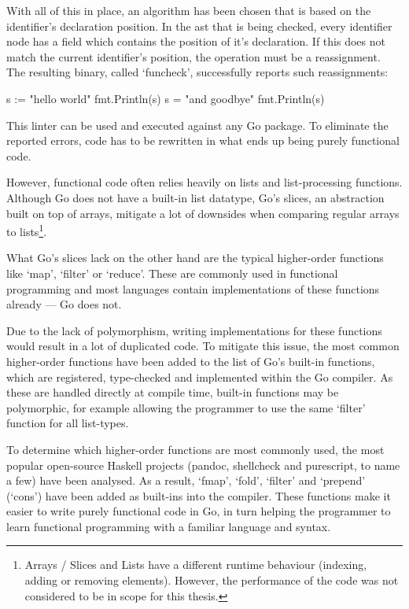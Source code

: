 With all of this in place, an algorithm has been chosen that is based on the identifier's
declaration position. In the \gls{ast} that is being checked, every identifier node has a field
which contains the position of it's declaration. If this does not match the current identifier's
position, the operation must be a reassignment.
The resulting binary, called `funcheck', successfully reports such reassignments:

\begin{gocode}
s := "hello world"
fmt.Println(s)
s = "and goodbye"
fmt.Println(s)
\end{gocode}


This linter can be used and executed against any Go package. To eliminate the reported errors,
code has to be rewritten in what ends up being purely functional code.

However, functional code often relies heavily on lists and list-processing functions.
Although Go does not have a built-in list datatype, Go's slices, an abstraction built
on top of arrays,
mitigate a lot of downsides when comparing regular arrays to lists\footnote{Arrays / Slices
and Lists have a different runtime behaviour (indexing, adding or removing elements).
However, the performance of the code was not considered to be in scope for this thesis.}.

What Go's slices lack on the other hand are the typical higher-order functions like `map',
`filter' or `reduce'. These are commonly used in functional programming and most languages
contain implementations of these functions already --- Go does not.

Due to the lack of polymorphism, writing implementations for these functions
would result in a lot of duplicated code. To mitigate this issue, the most
common higher-order functions have been added to the list of Go's built-in functions,
which are registered, type-checked and implemented within the Go compiler.
As these are handled directly at compile time, built-in functions may be polymorphic, for
example allowing the programmer to use the same `filter' function for all list-types.

To determine which higher-order functions are most commonly used, the most popular
open-source Haskell projects (pandoc, shellcheck and purescript, to name a few) have
been analysed. As a result, `fmap', `fold', `filter' and `prepend'
(`cons') have been added as built-ins into the compiler.
These functions make it easier to write purely functional code in Go, in turn helping
the programmer to learn functional programming with a familiar language and syntax.

